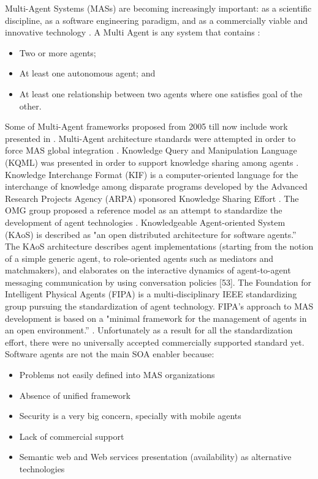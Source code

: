 \documentclass[12pt,a4paper,final,twoside,onecolumn,titlepage]{book}
\begin{document}
Multi-Agent Systems (MASs) are becoming increasingly important: as a scientific discipline, as a software engineering paradigm, and as a commercially viable and innovative technology \cite{BS41}. A Multi Agent is any system that contains \cite{BS42}:
\begin{itemize}
\item Two or more agents;
\item At least one autonomous agent; and
\item At least one relationship between two agents where one satisfies goal of the other.
\end{itemize}
Some of Multi-Agent frameworks proposed from 2005 till now include work presented in \cite{BS43, BS44, BS45, BS46, BS47, BS48}. Multi-Agent architecture standards were attempted in order to force \gls{MAS} global integration \cite{BS49}. Knowledge Query and Manipulation Language (\gls{KQML}) was presented in order to support knowledge sharing among agents \cite{BS50}. Knowledge Interchange Format (\gls{KIF}) is a computer-oriented language for the interchange of knowledge among disparate programs developed by the Advanced Research Projects Agency (\gls{ARPA}) sponsored Knowledge Sharing Effort \cite{R41}. The OMG group proposed a reference model as an attempt to standardize the development of agent technologies \cite{R42}. Knowledgeable Agent-oriented System (\gls{KAoS}) is described as "an open distributed architecture for software agents.'' The \gls{KAoS} architecture describes agent implementations (starting from the notion of a simple generic agent, to role-oriented agents such as mediators and matchmakers), and elaborates on the interactive dynamics of agent-to-agent messaging communication by using conversation policies [53]. The Foundation for Intelligent Physical Agents (\gls{FIPA}) is a multi-disciplinary IEEE standardizing group pursuing the standardization of agent technology. \gls{FIPA}'s approach to \gls{MAS} development is based on a "minimal framework for the management of agents in an open environment.'' \cite{BS54}. Unfortunately as a result for all the standardization effort, there were no universally accepted commercially supported standard yet. Software agents are not the main \gls{SOA} enabler because:
\begin{itemize}
\item Problems not easily defined into \gls{MAS} organizations
\item Absence of unified framework
\item Security is a very big concern, specially with mobile agents
\item Lack of commercial support
\item Semantic web and Web services presentation (availability) as alternative technologies
\end{itemize}
\end{document}
